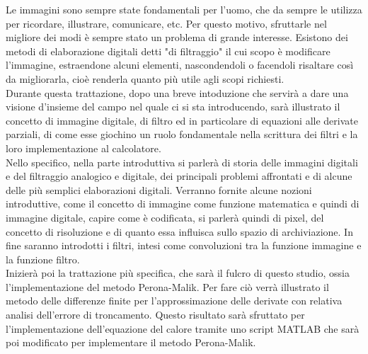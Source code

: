 Le immagini sono sempre state fondamentali per l'uomo, che da sempre le utilizza per ricordare, illustrare, comunicare, etc. Per questo motivo, sfruttarle nel migliore dei modi è sempre stato un problema di grande interesse. Esistono dei metodi di elaborazione digitali detti "di filtraggio" il cui scopo è modificare l'immagine, estraendone alcuni elementi, nascondendoli o facendoli risaltare così da migliorarla, cioè renderla quanto più utile agli scopi richiesti.\\
Durante questa trattazione, dopo una breve intoduzione che servirà a dare una visione d'insieme del campo nel quale ci si sta introducendo, sarà illustrato il concetto di immagine digitale, di filtro ed in particolare di equazioni alle derivate parziali, di come esse giochino un ruolo fondamentale nella scrittura dei filtri e la loro implementazione al calcolatore.\\
Nello specifico, nella parte introduttiva si parlerà di storia delle immagini digitali e del filtraggio analogico e digitale, dei principali problemi affrontati e di alcune delle più semplici elaborazioni digitali. Verranno fornite alcune nozioni introduttive, come il concetto di immagine come funzione matematica e quindi di immagine digitale, capire come è codificata, si parlerà quindi di pixel, del concetto di risoluzione e di quanto essa influisca sullo spazio di archiviazione. In fine saranno introdotti i filtri, intesi come convoluzioni tra la funzione immagine e la funzione filtro.\\
Inizierà poi la trattazione più specifica, che sarà il fulcro di questo studio, ossia l'implementazione del metodo Perona-Malik. Per fare ciò verrà illustrato il metodo delle differenze finite per l'approssimazione delle derivate con relativa analisi dell'errore di troncamento. Questo risultato sarà sfruttato per l'implementazione dell'equazione del calore tramite uno script MATLAB che sarà poi modificato per implementare il metodo Perona-Malik.   